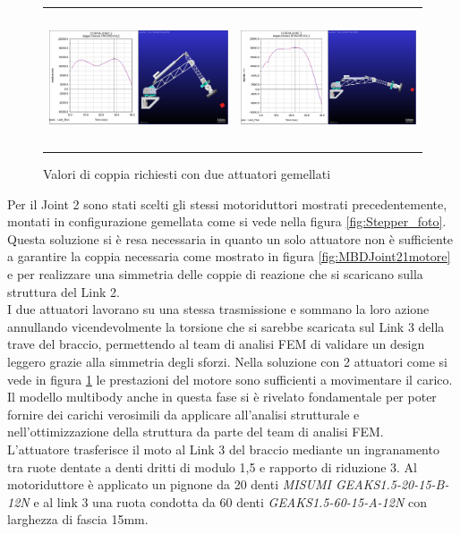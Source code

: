 \documentclass[%
corpo=11pt,
twoside,
 stile=classica,
oldstyle,
greek,%
]{toptesi}
\begin{document}
		\begin{figure} [!ht]
			\centering
			\begin{tabular}{ll}
				\includegraphics[height=4cm,keepaspectratio]{Plots/SPALLA/2motori/JOINT22favorevole.png}
				&
				\includegraphics[height=4cm,keepaspectratio]{Plots/SPALLA/2motori/JOINT22sfavorevole.png}
			\end{tabular}
			\caption{Valori di coppia richiesti con due attuatori gemellati}
			\label{fig:MBDJoint22motore}
		\end{figure}
		Per il Joint 2 sono stati scelti gli stessi motoriduttori mostrati precedentemente, montati in configurazione gemellata come si vede nella figura \ref{fig:Stepper_foto}. \\
		Questa soluzione si è resa necessaria in quanto un solo attuatore non è sufficiente a garantire la coppia necessaria come mostrato in figura \ref{fig:MBDJoint21motore} e per realizzare una simmetria delle coppie di reazione che si scaricano sulla struttura del Link 2. \\
		I due attuatori lavorano su una stessa trasmissione e sommano la loro azione annullando vicendevolmente la torsione che si sarebbe scaricata sul Link 3 della trave del braccio, permettendo al team di analisi FEM di validare un design leggero grazie alla simmetria degli sforzi. Nella soluzione con 2 attuatori come si vede in figura \ref{fig:MBDJoint22motore} le prestazioni del motore sono sufficienti a movimentare il carico. \\
		Il modello multibody anche in questa fase si è rivelato fondamentale per poter fornire dei carichi verosimili da applicare all'analisi strutturale e nell'ottimizzazione della struttura da parte del team di analisi FEM. 
		\\
		L'attuatore trasferisce il moto al Link 3 del braccio mediante un ingranamento tra ruote dentate a denti dritti di modulo 1,5 e rapporto di riduzione 3. Al motoriduttore è applicato un pignone da 20 denti \textit{MISUMI GEAKS1.5-20-15-B-12N} e al link 3 una ruota condotta da 60 denti \textit{GEAKS1.5-60-15-A-12N} con larghezza di fascia 15mm. \\
		
\end{document}
